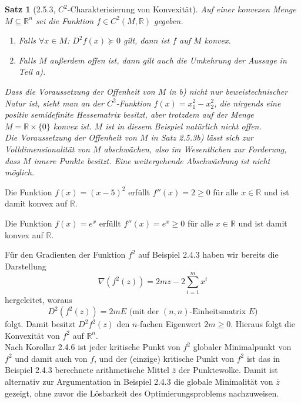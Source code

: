 \documentclass[12pt]{extreport} %
\newcommand{\R}{\mathbb{R}}
\theoremstyle{named}
\theoremstyle{nnamed}
\theoremstyle{itshape}
\newtheorem*{satz}{Satz}
\theoremstyle{normal}
\begin{document}
\begin{satz}[2.5.3, $C^2$-Charakterisierung von Konvexität]
	Auf einer konvexen Menge $M \subseteq \R^n$ sei die Funktion $f \in C^2(M, \R)$	gegeben. 
	\begin{enumerate}
		\item Falls $\forall x \in M$: $D^2 f(x) \succeq 0$ gilt, dann ist $f$ auf $M$ konvex.
		\item Falls $M$ außerdem offen ist, dann gilt auch die Umkehrung der Aussage in Teil a).
	\end{enumerate}
	Dass die Voraussetzung der Offenheit von $M$ in b) nicht nur beweistechnischer Natur ist, sieht man an der $C^2$-Funktion $f(x) = x_1^2 - x_2^2$, die nirgends eine positiv semidefinite Hessematrix besitzt, aber trotzdem auf der Menge $M = \R \times \{ 0 \}$ konvex ist. $M$ ist in diesem Beispiel natürlich nicht offen. ~\\
	
	Die Voraussetzung der Offenheit von $M$ in Satz 2.5.3b) lässt sich zur Volldimensionalität von $M$ abschwächen, also im Wesentlichen zur Forderung, dass $M$ innere Punkte besitzt. Eine weitergehende Abschwächung ist nicht möglich.
\end{satz}

\begin{beispiel}[2.5.3]
	Die Funktion $f(x) = (x - 5)^2$ erfüllt $f''(x) = 2 \geq 0$ für alle $x \in \R$ und ist damit konvex auf $\R$.	
\end{beispiel}

\begin{beispiel}[2.5.5]
	Die Funktion $f(x) = e^x$ erfüllt $f''(x) = e^x \geq 0$ für alle $x \in \R$ und ist damit konvex auf $\R$.	
\end{beispiel}

\begin{beispiel}
	Für den Gradienten der Funktion $f^2$ auf Beispiel 2.4.3 haben wir bereits die Darstellung 
	$$ \nabla \left( f^2(z) \right) = 2 mz - 2 \sum_{i=1}^{m} x^i $$	
	hergeleitet, woraus
	$$ D^2 \left( f^2(z) \right) = 2mE \text{ (mit der $(n,n)$-Einheitsmatrix $E$)} $$
	folgt. Damit besitzt $D^2 f^2(z)$ den $n$-fachen Eigenwert $2m \geq 0$. Hieraus folgt die Konvexität von $f^2$ auf $\R^n$. ~\\
	
	Nach Korollar 2.4.6 ist jeder kritische Punkt von $f^2$ globaler Minimalpunkt von $f^2$ und damit auch von $f$, und der (einzige) kritische Punkt von $f^2$ ist das in Beispiel 2.4.3 berechnete arithmetische Mittel $\overline{z}$ der Punktewolke. Damit ist alternativ zur Argumentation in Beispiel 2.4.3 die globale Minimalität von $\overline{z}$ gezeigt, ohne zuvor die Lösbarkeit des Optimierungsproblems nachzuweisen.
\end{beispiel}
\end{document}
